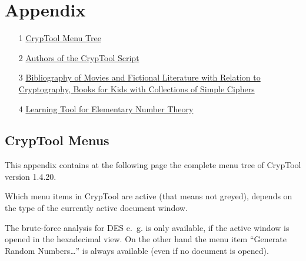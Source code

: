 
\newpage
\hypertarget{appendix-start}{}\label{s:appendix-start}

\chapter{Appendix}

    \begin{itemize}

      \item[1] \hyperlink{appendix-menutree}{CrypTool Menu Tree}

      \item[2] \hyperlink{appendix-authors}{Authors of the CrypTool Script}

      \item[3] \hyperlink{appendix-authors}{Bibliography of Movies and
                     Fictional Literature with Relation to Cryptography,
                     Books for Kids with Collections of Simple Ciphers}

      \item[4] \hyperlink{appendix-Learn-NT}
                     {Learning Tool for Elementary Number Theory}

    \end{itemize}




\newpage
\enlargethispage{1cm}
\hypertarget{appendix-menutree}{}
\section{CrypTool Menus}
\label{s:appendix-menutree}

This appendix contains at the following page the complete menu tree of
CrypTool version 1.4.20. 

Which menu items in CrypTool are active (that means not greyed), depends on
the type of the currently active document window.

The brute-force analysis for DES e.~g. is only
available, if the active window is opened in the hexadecimal view. 
On the other hand the menu item ``Generate Random Numbers\dots''
is always available (even if no document is opened).



